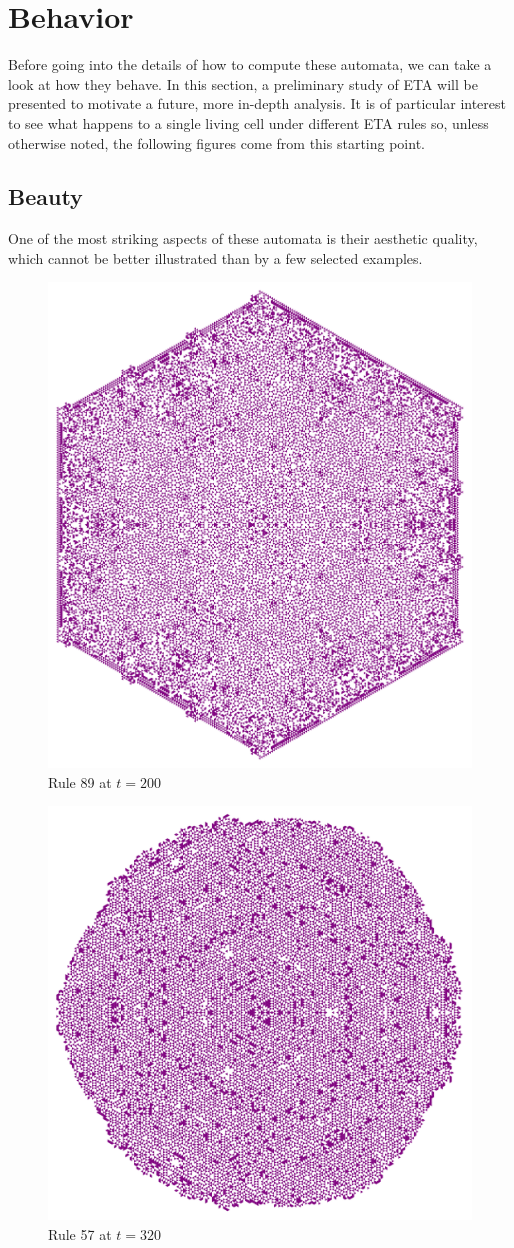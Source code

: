 \documentclass{article}
\begin{document}
\section{Behavior} \label{behavior}
Before going into the details of how to compute these automata, we can take a look at how they behave. In this section, a preliminary study of ETA will be presented to motivate a future, more in-depth analysis. It is of particular interest to see what happens to a single living cell under different ETA rules so, unless otherwise noted, the following figures come from this starting point.

\pagebreak
\subsection{Beauty} \label{beauty}
One of the most striking aspects of these automata is their aesthetic quality, which cannot be better illustrated than by a few selected examples.

\begin{figure}[H]
    \centering
    \includegraphics[width=.59\textwidth]{graphics/behavior/beauty/rule-89-time-200-OneAlive.pdf}
    \caption{Rule 89 at $t=200$}
    \label{fig:rule-89-time-200-OneAlive}
\end{figure}
\begin{figure}[H]
    \centering
    \includegraphics[width=.59\textwidth]{graphics/behavior/beauty/rule-57-time-320-OneAlive.pdf}
    \caption{Rule 57 at $t=320$}
    \label{fig:rule-57-time-320-OneAlive}
\end{figure}
\end{document}
